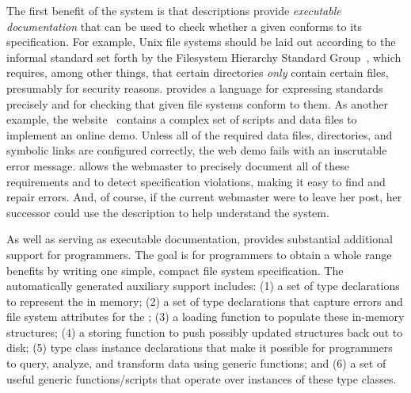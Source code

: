 The first benefit of the \forest{} system is that 
\forest{} descriptions provide {\em executable documentation} that can
be used to check whether a given \filestore{} conforms to its
specification.  For example, Unix file systems should be laid out
according to the informal standard set forth by the Filesystem
Hierarchy Standard Group~\cite{fsh}, which requires, among other
things, that certain directories \textit{only} contain certain files,
presumably for security reasons. \forest{} provides a language for
expressing standards precisely and for checking that given file
systems conform to them.  As another example, the
\pads{} website~\cite{padsweb} contains a complex set of scripts and
data files to implement an online demo.  Unless all of the required
data files, directories, and symbolic links are configured correctly,
the web demo fails with an inscrutable error message.  \forest{}
allows the \pads{} webmaster to precisely document all of these
requirements and to detect specification violations, making it easy to
find and repair errors.  And, of course, if the current webmaster were
to leave her post, her successor could use the \forest{} description
to help understand the system.

As well as serving as executable documentation, \forest{} 
provides substantial additional support for
programmers.  The goal is for programmers to obtain a whole range
benefits by writing one simple, compact file system specification.
The automatically generated auxiliary support includes:
(1) a set of type declarations to represent the \filestore{} in memory;
(2) a set of type declarations that capture errors and file system attributes for the \filestore{};
(3) a loading function to populate these in-memory structures;
(4) a storing function to push possibly updated structures back out to disk;
(5) type class instance declarations that make it possible for
   programmers to query, analyze, and transform \filestore{} data
   using generic functions; and 
(6) a set of useful generic functions/scripts that operate over instances 
    of these type classes.


